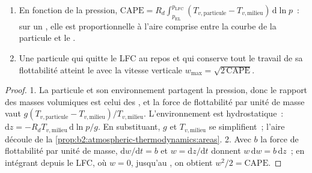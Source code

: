 \begin{proposition}\label{prop:b2:atmospheric-thermodynamics:buoyancy}
\begin{enumerate}
  \item En fonction de la pression, $\text{CAPE} = R_d \int_{p_{\text{EL}}}^{p_{\text{LFC}}}
        (T_{v,\text{particule}} - T_{v,\text{milieu}})\,\mathrm{d}\ln p$~: sur un , elle est
        proportionnelle à l'aire comprise entre la courbe de la particule et le .
  \item Une particule qui quitte le LFC au repos et qui conserve tout le travail de sa flottabilité
        atteint le  avec la vitesse verticale $w_{\max} = \sqrt{2\,\text{CAPE}}$.
\end{enumerate}
\end{proposition}

\begin{proof}
1. La particule et son environnement partagent la pression, donc le rapport des masses volumiques
est celui des , et la force de flottabilité par unité de masse vaut
$g(T_{v,\text{particule}} - T_{v,\text{milieu}})/T_{v,\text{milieu}}$. L'environnement est hydrostatique~:
$\mathrm{d}z = -R_dT_{v,\text{milieu}}\,\mathrm{d}\ln p/g$. En substituant, $g$ et $T_{v,\text{milieu}}$
se simplifient~; l'aire découle de la \cref{prop:b2:atmospheric-thermodynamics:areas}. 2. Avec $b$
la force de flottabilité par unité de masse, $\mathrm{d}w/\mathrm{d}t = b$ et $w = \mathrm{d}z/
\mathrm{d}t$ donnent $w\,\mathrm{d}w = b\,\mathrm{d}z$~; en intégrant depuis le
LFC, où $w = 0$, jusqu'au , on obtient $w^2/2 = \text{CAPE}$.
\end{proof}

